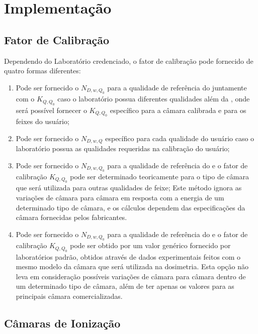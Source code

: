 \documentclass[11pt,a4paper]{article}
\begin{document}
	\section{Implementação}

	\subsection{Fator de Calibração}

		Dependendo do Laboratório credenciado, o fator de calibração pode fornecido de quatro formas diferentes:

		\begin{enumerate}
			\item Pode ser fornecido o $N_{D,w,Q_0}$ para a qualidade de referência do  juntamente com o  $K_{Q,Q_0}$ caso o laboratório possua diferentes qualidades além da , onde será possível fornecer o $K_{Q,Q_0}$ específico para a câmara calibrada e para os feixes do usuário;
			
			\item Pode ser fornecido o $N_{D,w,Q}$ específico para cada qualidade do usuário caso o laboratório possua as qualidades requeridas na calibração do usuário;
			
			\item Pode ser fornecido o $N_{D,w,Q_0}$ para a qualidade de referência do  e o fator de calibração $K_{Q,Q_0}$ pode ser determinado teoricamente para o tipo de câmara que será utilizada para outras qualidades de feixe; Este método ignora as variações de câmara para câmara em resposta com a energia de um determinado tipo de câmara, e os cálculos dependem das especificações da câmara fornecidas pelos fabricantes.
	
			\item Pode ser fornecido o $N_{D,w,Q_0}$ para a qualidade de referência do  e o fator de calibração $K_{Q,Q_0}$ pode ser obtido por um valor genérico fornecido por laboratórios padrão, obtidos através de dados experimentais feitos com o mesmo modelo da câmara que será utilizada na dosimetria. Esta opção não leva em consideração possíveis variações de câmara para câmara dentro de um determinado tipo de câmara, além de ter apenas os valores para as principais câmara comercializadas. 
		\end{enumerate}


	\subsection{Câmaras de Ionização}
\end{document}
